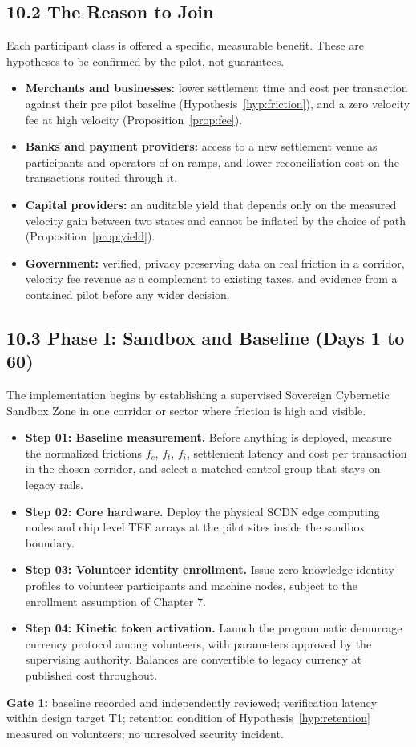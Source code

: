 \documentclass[11pt,a4paper]{article}
\theoremstyle{definition}
\theoremstyle{plain}
\theoremstyle{remark}
\begin{document}
\subsection*{10.2 The Reason to Join}
Each participant class is offered a specific, measurable benefit. These are hypotheses to be confirmed by the pilot, not guarantees.
\begin{itemize}
\item \textbf{Merchants and businesses:} lower settlement time and cost per transaction against their pre pilot baseline (Hypothesis~\ref{hyp:friction}), and a zero velocity fee at high velocity (Proposition~\ref{prop:fee}).
\item \textbf{Banks and payment providers:} access to a new settlement venue as participants and operators of on ramps, and lower reconciliation cost on the transactions routed through it.
\item \textbf{Capital providers:} an auditable yield that depends only on the measured velocity gain between two states and cannot be inflated by the choice of path (Proposition~\ref{prop:yield}).
\item \textbf{Government:} verified, privacy preserving data on real friction in a corridor, velocity fee revenue as a complement to existing taxes, and evidence from a contained pilot before any wider decision.
\end{itemize}

\subsection*{10.3 Phase I: Sandbox and Baseline (Days 1 to 60)}
The implementation begins by establishing a supervised Sovereign Cybernetic Sandbox Zone in one corridor or sector where friction is high and visible.
\begin{itemize}
\item \textbf{Step 01: Baseline measurement.} Before anything is deployed, measure the normalized frictions $f_c$, $f_t$, $f_i$, settlement latency and cost per transaction in the chosen corridor, and select a matched control group that stays on legacy rails.
\item \textbf{Step 02: Core hardware.} Deploy the physical SCDN edge computing nodes and chip level TEE arrays at the pilot sites inside the sandbox boundary.
\item \textbf{Step 03: Volunteer identity enrollment.} Issue zero knowledge identity profiles to volunteer participants and machine nodes, subject to the enrollment assumption of Chapter 7.
\item \textbf{Step 04: Kinetic token activation.} Launch the programmatic demurrage currency protocol among volunteers, with parameters approved by the supervising authority. Balances are convertible to legacy currency at published cost throughout.
\end{itemize}
\textbf{Gate 1:} baseline recorded and independently reviewed; verification latency within design target T1; retention condition of Hypothesis~\ref{hyp:retention} measured on volunteers; no unresolved security incident.
\end{document}
